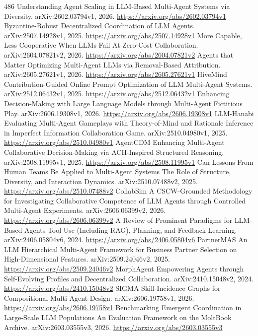 \documentclass[11pt]{article}
\begin{document}
\begin{thebibliography}{486}
 Understanding Agent Scaling in LLM-Based Multi-Agent Systems via Diversity. arXiv:2602.03794v1, 2026. \url{https://arxiv.org/abs/2602.03794v1}
 Byzantine-Robust Decentralized Coordination of LLM Agents. arXiv:2507.14928v1, 2025. \url{https://arxiv.org/abs/2507.14928v1}
 More Capable, Less Cooperative When LLMs Fail At Zero-Cost Collaboration. arXiv:2604.07821v2, 2026. \url{https://arxiv.org/abs/2604.07821v2}
 Agents that Matter Optimizing Multi-Agent LLMs via Removal-Based Attribution. arXiv:2605.27621v1, 2026. \url{https://arxiv.org/abs/2605.27621v1}
 HiveMind Contribution-Guided Online Prompt Optimization of LLM Multi-Agent Systems. arXiv:2512.06432v1, 2025. \url{https://arxiv.org/abs/2512.06432v1}
 Enhancing Decision-Making with Large Language Models through Multi-Agent Fictitious Play. arXiv:2606.19308v1, 2026. \url{https://arxiv.org/abs/2606.19308v1}
 LLM-Hanabi Evaluating Multi-Agent Gameplays with Theory-of-Mind and Rationale Inference in Imperfect Information Collaboration Game. arXiv:2510.04980v1, 2025. \url{https://arxiv.org/abs/2510.04980v1}
 AgentCDM Enhancing Multi-Agent Collaborative Decision-Making via ACH-Inspired Structured Reasoning. arXiv:2508.11995v1, 2025. \url{https://arxiv.org/abs/2508.11995v1}
 Can Lessons From Human Teams Be Applied to Multi-Agent Systems The Role of Structure, Diversity, and Interaction Dynamics. arXiv:2510.07488v2, 2025. \url{https://arxiv.org/abs/2510.07488v2}
 CollabSim A CSCW-Grounded Methodology for Investigating Collaborative Competence of LLM Agents through Controlled Multi-Agent Experiments. arXiv:2606.06399v2, 2026. \url{https://arxiv.org/abs/2606.06399v2}
 A Review of Prominent Paradigms for LLM-Based Agents Tool Use (Including RAG), Planning, and Feedback Learning. arXiv:2406.05804v6, 2024. \url{https://arxiv.org/abs/2406.05804v6}
 PartnerMAS An LLM Hierarchical Multi-Agent Framework for Business Partner Selection on High-Dimensional Features. arXiv:2509.24046v2, 2025. \url{https://arxiv.org/abs/2509.24046v2}
 MorphAgent Empowering Agents through Self-Evolving Profiles and Decentralized Collaboration. arXiv:2410.15048v2, 2024. \url{https://arxiv.org/abs/2410.15048v2}
 SIGMA Skill-Incidence Graphs for Compositional Multi-Agent Design. arXiv:2606.19758v1, 2026. \url{https://arxiv.org/abs/2606.19758v1}
 Benchmarking Emergent Coordination in Large-Scale LLM Populations An Evaluation Framework on the MoltBook Archive. arXiv:2603.03555v3, 2026. \url{https://arxiv.org/abs/2603.03555v3}

\end{thebibliography}
\end{document}
